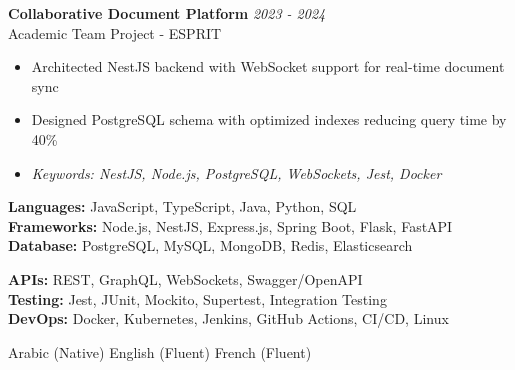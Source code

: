 \documentclass[11pt,a4paper]{article}
\begin{document}
\textbf{Collaborative Document Platform} \hfill \textit{2023 - 2024}\\[-2pt]
Academic Team Project - ESPRIT\\[-5pt]
\begin{itemize}[leftmargin=8pt,itemsep=1pt,topsep=2pt]
  \item Architected NestJS backend with WebSocket support for real-time document sync
  \item Designed PostgreSQL schema with optimized indexes reducing query time by 40\%
  \item[] \textit{\footnotesize Keywords: NestJS, Node.js, PostgreSQL, WebSockets, Jest, Docker}
\end{itemize}\vspace{3pt}

{\small
\begin{minipage}[t]{0.48\textwidth}
  \textbf{Languages:} JavaScript, TypeScript, Java, Python, SQL\\[1.5pt]
  \textbf{Frameworks:} Node.js, NestJS, Express.js, Spring Boot, Flask, FastAPI\\[1.5pt]
  \textbf{Database:} PostgreSQL, MySQL, MongoDB, Redis, Elasticsearch
\end{minipage}
\hfill
\begin{minipage}[t]{0.48\textwidth}
  \textbf{APIs:} REST, GraphQL, WebSockets, Swagger/OpenAPI\\[1.5pt]
  \textbf{Testing:} Jest, JUnit, Mockito, Supertest, Integration Testing\\[1.5pt]
  \textbf{DevOps:} Docker, Kubernetes, Jenkins, GitHub Actions, CI/CD, Linux
\end{minipage}
}

Arabic (Native) \textbar{} English (Fluent) \textbar{} French (Fluent)
\end{document}
